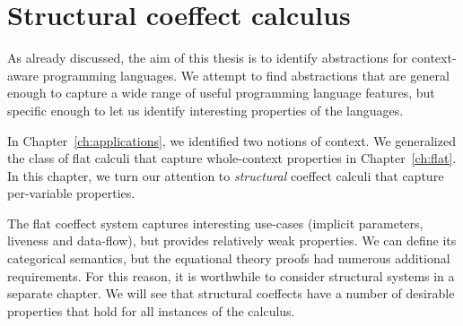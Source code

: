 
\chapter{Structural coeffect calculus} 
\label{ch:structural}

As already discussed, the aim of this thesis is to identify abstractions for context-aware
programming languages. We attempt to find abstractions that are general enough to capture a wide
range of useful programming language features, but specific enough to let us identify
interesting properties of the languages.

In Chapter~\ref{ch:applications}, we identified two notions of context. We generalized the 
class of flat calculi that capture whole-context properties in Chapter~\ref{ch:flat}. 
In this chapter, we turn our attention to \emph{structural} coeffect calculi that capture
per-variable properties.

The flat coeffect system captures interesting use-cases (implicit parameters, liveness and
data-flow), but provides relatively weak properties. We can define its categorical semantics,
but the equational theory proofs had numerous additional requirements. For this reason, it
is worthwhile to consider structural systems in a separate chapter. We will see that 
structural coeffects have a number of desirable properties that hold for all instances of the
calculus.



%                                                                                      
%                                                                                     


